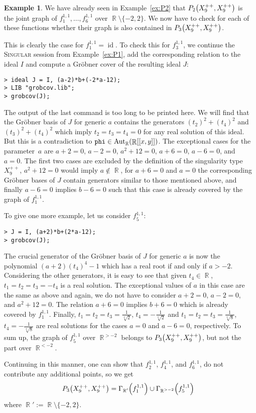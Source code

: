 \documentclass{amsproc}
\theoremstyle{definition}
\newtheorem{example}[theorem]{Example}
\let\originalleft\left
\let\originalright\right
\renewcommand{\left}{\mathopen{}\mathclose\bgroup\originalleft}
\renewcommand{\right}{\aftergroup\egroup\originalright}
\newcommand{\Singular}{\textsc{Singular}}
\DeclareMathOperator{\R}{\mathbb{R}}
\DeclareMathOperator{\Aut}{Aut}
\DeclareMathOperator{\id}{id}
\begin{document}
\begin{example}
We have already seen in Example~\ref{ex:P2} that
$P_2\left(X_9^{++}, X_9^{++}\right)$ is the joint graph of
$f_1^{1,1}, \ldots, f_6^{1,1}$ over $\R \setminus \{-2, 2\}$. We now have to
check for each of these functions whether their graph is also contained in
$P_3\left(X_9^{++}, X_9^{++}\right)$.

This is clearly the case for $f_1^{1,1} = \id$. To check this for $f_3^{1,1}$,
we continue the \Singular{} session from Example~\ref{ex:P1}, add the
corresponding relation to the ideal $I$ and compute a Gr\"obner cover of the
resulting ideal $J$:
\begin{verbatim}
> ideal J = I, (a-2)*b+(-2*a-12);
> LIB "grobcov.lib";
> grobcov(J);
\end{verbatim}
The output of the last command is too long to be printed here. We will find
that the Gr\"obner basis of $J$ for generic $a$ contains the generators
$(t_2)^2+(t_4)^2$ and $(t_3)^2+(t_4)^2$ which imply $t_2 = t_3 = t_4 = 0$ for
any real solution of this ideal. But this is a contradiction to
$\verb+phi+ \in \Aut_{\R}(\R[[x,y]])$. The exceptional cases for the
parameter~$a$ are $a+2=0$, $a-2=0$, $a^2+12=0$, $a+6=0$, $a-6=0$, and $a=0$.
The first two cases are excluded by the definition of the singularity type
$X_9^{++}$, $a^2+12=0$ would imply $a \not\in \R$, for $a+6=0$ and $a=0$ the
corresponding Gr\"obner bases of $J$ contain generators similar to those
mentioned above, and finally $a-6=0$ implies $b-6=0$ such that this case is
already covered by the graph of $f_1^{1,1}$.

To give one more example, let us consider $f_5^{1,1}$:
\begin{verbatim}
> J = I, (a+2)*b+(2*a-12);
> grobcov(J);
\end{verbatim}
The crucial generator of the Gr\"obner basis of $J$ for generic $a$ is now the
polynomial $(a+2)(t_4)^4-1$ which has a real root if and only if $a > -2$.
Considering the other generators, it is easy to see that given $t_4 \in \R$,
$t_1 = t_2 = t_3 = -t_4$ is a real solution. The exceptional values
of $a$ in this case are the same as above and again, we do not have to consider
$a+2=0$, $a-2=0$, and $a^2+12=0$. The relation $a+6=0$ implies $b+6=0$ which is
already covered by $f_1^{1,1}$. Finally,
$t_1 = t_2 = t_3 = \frac{1}{\sqrt[4]{2}}$, $t_4 = -\frac{1}{\sqrt[4]{2}}$ and
$t_1 = t_2 = t_3 = \frac{1}{\sqrt[4]{8}}$, $t_4 = -\frac{1}{\sqrt[4]{8}}$ are
real solutions for the cases $a=0$ and $a-6=0$, respectively. To sum up,
the graph of $f_5^{1,1}$ over $\R^{>-2}$ belongs to
$P_3\left(X_9^{++}, X_9^{++}\right)$, but not the part over $\R^{<-2}$.

Continuing in this manner, one can show that $f_2^{1,1}$, $f_4^{1,1}$, and
$f_6^{1,1}$, do not contribute any additional points, so we get
\[
P_3\left(X_9^{++}, X_9^{++}\right) = \Gamma_{\R'} \left(f_1^{1,1}\right)
\cup \Gamma_{\R^{>-2}} \left(f_5^{1,1}\right)
\]
where $\R' := \R \setminus \{-2, 2\}$.
\end{example}
\end{document}
